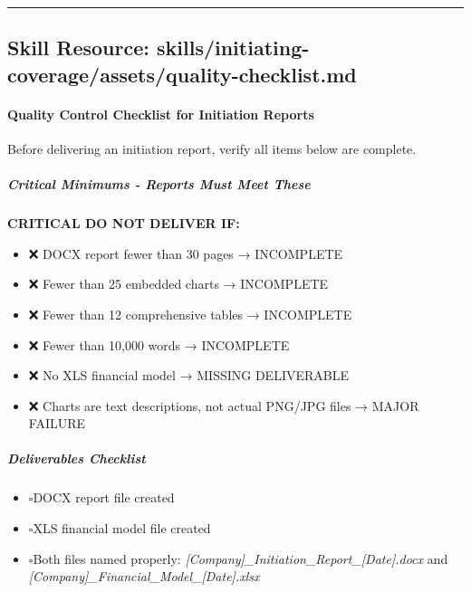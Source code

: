 \documentclass[11pt]{article}
\newcommand{\UncheckedBox}{$\square$}
\begin{document}
\vspace{0.8em}\hrule\vspace{0.8em}

\subsection{Skill Resource: skills/initiating-coverage/assets/quality-checklist.md}\label{file:skills-initiating-coverage-assets-quality-checklist-md}

\paragraph{Quality Control Checklist for Initiation Reports}\mbox{}\par

Before delivering an initiation report, verify all items below are complete.


\subparagraph{Critical Minimums - Reports Must Meet These}\mbox{}\par

\textbf{CRITICAL DO NOT DELIVER IF:}

\begin{itemize}[leftmargin=*,itemsep=2pt,topsep=2pt]
\item {} ❌ DOCX report fewer than 30 pages → INCOMPLETE
\item {} ❌ Fewer than 25 embedded charts → INCOMPLETE
\item {} ❌ Fewer than 12 comprehensive tables → INCOMPLETE
\item {} ❌ Fewer than 10,000 words → INCOMPLETE
\item {} ❌ No XLS financial model → MISSING DELIVERABLE
\item {} ❌ Charts are text descriptions, not actual PNG/JPG files → MAJOR FAILURE
\end{itemize}

\subparagraph{Deliverables Checklist}\mbox{}\par

\begin{itemize}[leftmargin=*,itemsep=2pt,topsep=2pt]
\item {} \UncheckedBox DOCX report file created
\item {} \UncheckedBox XLS financial model file created
\item {} \UncheckedBox Both files named properly: \emph{[Company]\_\allowbreak{}Initiation\_\allowbreak{}Report\_\allowbreak{}[Date].docx} and \emph{[Company]\_\allowbreak{}Financial\_\allowbreak{}Model\_\allowbreak{}[Date].xlsx}
\end{itemize}
\end{document}
